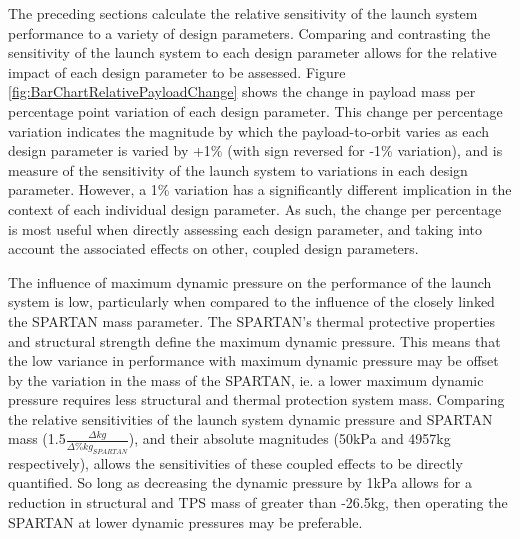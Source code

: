 The preceding sections calculate the relative sensitivity of the launch system performance to a variety of design parameters. 
Comparing and contrasting the sensitivity of the launch system to each design parameter allows for the relative impact of each design parameter to be assessed. 
Figure \ref{fig:BarChartRelativePayloadChange} shows the change in payload mass per percentage point variation of each design parameter. 
This change per percentage variation indicates the magnitude by which the payload-to-orbit varies as each design parameter is varied by +1\% (with sign reversed for -1\% variation), and is measure of the sensitivity of the launch system to variations in each design parameter. 
However, a 1\% variation has a significantly different implication in the context of each individual design parameter. 
As such, the change per percentage is most useful when directly assessing each design parameter, and taking into account the associated effects on other, coupled design parameters. 

The influence of maximum dynamic pressure on the performance of the launch system is low, particularly when compared to the influence of the closely linked the SPARTAN mass parameter. The SPARTAN's thermal protective properties and structural strength define the maximum dynamic pressure. This means that the low variance in performance with maximum dynamic pressure may be offset by the variation in the mass of the SPARTAN, ie. a lower maximum dynamic pressure requires less structural and thermal protection system mass.
 Comparing the relative sensitivities of the launch system dynamic pressure and SPARTAN mass (1.5$\frac{\Delta kg}{\Delta\%kg_{SPARTAN}}$), and their absolute magnitudes (50kPa and 4957kg respectively), allows the sensitivities of these coupled effects to be directly quantified. So long as decreasing the dynamic pressure by 1kPa allows for a reduction in structural and TPS mass of greater than -26.5kg, then operating the SPARTAN at lower dynamic pressures may be preferable. 

